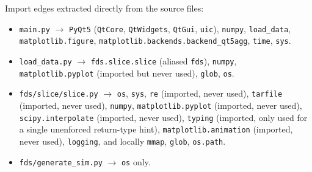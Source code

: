 \documentclass[11pt,a4paper]{report}
\begin{document}
\begin{factbox}
Import edges extracted directly from the source files:
\begin{itemize}[nosep]
  \item \texttt{main.py} $\rightarrow$ \texttt{PyQt5} (\texttt{QtCore}, \texttt{QtWidgets}, \texttt{QtGui}, \texttt{uic}), \texttt{numpy}, \texttt{load\_data}, \texttt{matplotlib.figure}, \texttt{matplotlib.backends.backend\_qt5agg}, \texttt{time}, \texttt{sys}.
  \item \texttt{load\_data.py} $\rightarrow$ \texttt{fds.slice.slice} (aliased \texttt{fds}), \texttt{numpy}, \texttt{matplotlib.pyplot} (imported but never used), \texttt{glob}, \texttt{os}.
  \item \texttt{fds/slice/slice.py} $\rightarrow$ \texttt{os}, \texttt{sys}, \texttt{re} (imported, never used), \texttt{tarfile} (imported, never used), \texttt{numpy}, \texttt{matplotlib.pyplot} (imported, never used), \texttt{scipy.interpolate} (imported, never used), \texttt{typing} (imported, only used for a single unenforced return-type hint), \texttt{matplotlib.animation} (imported, never used), \texttt{logging}, and locally \texttt{mmap}, \texttt{glob}, \texttt{os.path}.
  \item \texttt{fds/generate\_sim.py} $\rightarrow$ \texttt{os} only.
\end{itemize}
\end{factbox}
\end{document}
